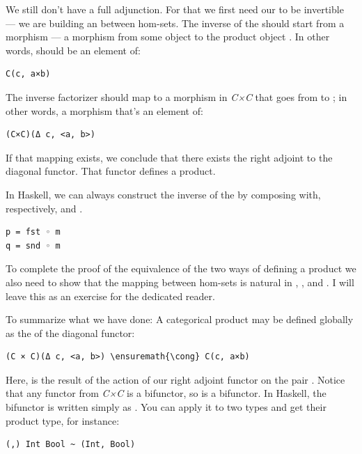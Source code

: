\noindent
We still don't have a full adjunction. For that we first need our
 to be invertible --- we are building an
 between hom-sets. The inverse of the
 should start from a morphism  --- a
morphism from some object  to the product object .
In other words,  should be an element of:

\begin{verbatim}
C(c, a×b)
\end{verbatim}
The inverse factorizer should map  to a morphism
 in \emph{C×C} that goes from
 to
; in other words, a morphism
that's an element of:

\begin{verbatim}
(C×C)(Δ c, <a, b>)
\end{verbatim}
If that mapping exists, we conclude that there exists the right adjoint
to the diagonal functor. That functor defines a product.

In Haskell, we can always construct the inverse of the
 by composing  with, respectively,
 and .

\begin{verbatim}
p = fst ◦ m
q = snd ◦ m
\end{verbatim}
To complete the proof of the equivalence of the two ways of defining a
product we also need to show that the mapping between hom-sets is
natural in , , and . I will leave this as
an exercise for the dedicated reader.

To summarize what we have done: A categorical product may be defined
globally as the  of the diagonal functor:

\begin{Verbatim}[commandchars=\\\{\}]
(C × C)(Δ c, <a, b>) \ensuremath{\cong} C(c, a×b)
\end{Verbatim}
Here,  is the result of the action of our right adjoint
functor  on the pair
. Notice that any functor from
\emph{C×C} is a bifunctor, so  is a bifunctor. In
Haskell, the  bifunctor is written simply as
\code{(,)}. You can apply it to two types and get their product type,
for instance:

\begin{verbatim}
(,) Int Bool ~ (Int, Bool)
\end{verbatim}


